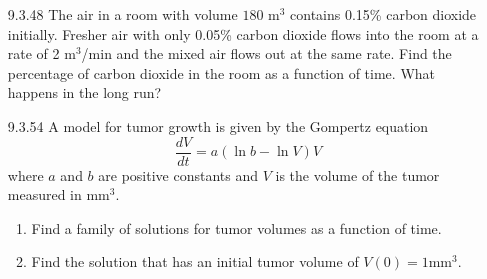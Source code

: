 \documentclass{article}
\begin{document}
\begin{enumerate}
\newpage

\item[9.3.48]
    The air in a room with volume $180$ m$^{3}$ contains 0.15\% carbon dioxide initially.
    Fresher air with only 0.05\% carbon dioxide flows into the room at a rate of
    2 m$^{3}$/min and the mixed air flows out at the same rate. Find the percentage
    of carbon dioxide in the room as a function of time. What happens in the long run?

\vspace{6cm}

\item[9.3.54]
    A model for tumor growth is given by the Gompertz equation
    \[
        \frac{dV}{dt} = a (\ln b - \ln V) V
    \]
    where $a$ and $b$ are positive constants and $V$ is the volume of the tumor measured
    in mm$^{3}$.
    \begin{enumerate}
        \item Find a family of solutions for tumor volumes as a function of time.
        \item Find the solution that has an initial tumor volume of
            $V(0) = 1 \text{mm}^{3}$.
    \end{enumerate}

\end{enumerate}
\end{document}
